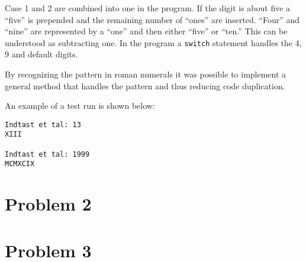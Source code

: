 \documentclass{scrartcl}
\newcommand\code[1]{\texttt{#1}}
\begin{document}
Case 1 and 2 are combined into one in the program. If the digit is about five a ``five'' is prepended and the remaining number of ``ones'' are inserted. ``Four'' and ``nine'' are represented by a ``one'' and then either ``five'' or ``ten.'' This can be understood as subtracting one. In the program a \code{switch} statement handles the 4, 9 and default digits.

By recognizing the pattern in roman numerals it was possible to implement a general method that handles the pattern and thus reducing code duplication.

An example of a test run is shown below:

\begin{Verbatim}
Indtast et tal: 13
XIII

Indtast et tal: 1999
MCMXCIX
\end{Verbatim}

\section*{Problem 2}



\section*{Problem 3}
\end{document}
